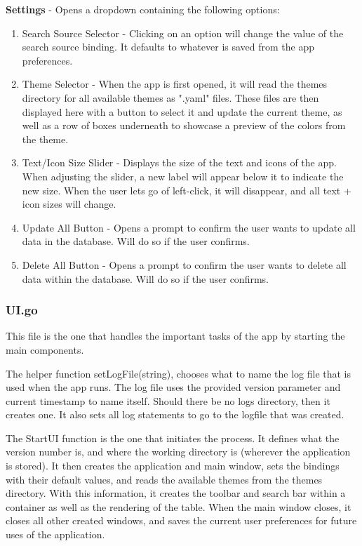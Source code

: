 \textbf{Settings} - Opens a dropdown containing the following options:
\begin{enumerate}
	\item Search Source Selector - Clicking on an option will change the
		value of the search source binding. It defaults to whatever is
		saved from the app preferences.
	\item Theme Selector - When the app is first opened, it will read
		the themes directory for all available themes as ".yaml" files.
		These files are then displayed here with a button to select it and
		update the current theme, as well as a row of boxes underneath to
		showcase a preview of the colors from the theme.
	\item Text/Icon Size Slider - Displays the size of the text and icons
		of the app. When adjusting the slider, a new label will appear
		below it to indicate the new size. When the user lets go of
		left-click, it will disappear, and all text + icon sizes will change.
	\item Update All Button - Opens a prompt to confirm the user wants
		to update all data in the database. Will do so if the user confirms.
	\item Delete All Button - Opens a prompt to confirm the user wants
		to delete all data within the database. Will do so if the user confirms.
\end{enumerate}

\subsubsection{UI.go}
\label{subsubsec:UI}

This file is the one that handles the important tasks of the app by
starting the main components.

The helper function setLogFile(string), chooses what to name the log file
that is used when the app runs.
The log file uses the provided version parameter and current
timestamp to name itself. Should
there be no logs directory, then it creates one.
It also sets all log statements to go to the logfile that was created.

The StartUI function is the one that initiates the process. It
defines what the version number is, and where the working directory
is (wherever the application is stored).
It then creates the application and main window, sets the bindings
with their default values, and reads the available themes from the
themes directory.
With this information, it creates the toolbar and search bar within a
container as well as the rendering of the table.
When the main window closes, it closes all other created windows, and
saves the current user preferences for future uses of the application.
